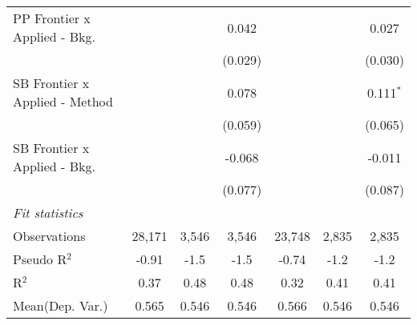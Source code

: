 \begin{tabular}{lcccccc}
   PP Frontier x Applied - Bkg.   &                &              & 0.042          &                &              & 0.027\\   
                                  &                &              & (0.029)        &                &              & (0.030)\\   
   SB Frontier x Applied - Method &                &              & 0.078          &                &              & 0.111$^{*}$\\   
                                  &                &              & (0.059)        &                &              & (0.065)\\   
   SB Frontier x Applied - Bkg.   &                &              & -0.068         &                &              & -0.011\\   
                                  &                &              & (0.077)        &                &              & (0.087)\\   
   \midrule
   \emph{Fit statistics}\\
   Observations                   & 28,171         & 3,546        & 3,546          & 23,748         & 2,835        & 2,835\\  
   Pseudo R$^2$                   & -0.91          & -1.5         & -1.5           & -0.74          & -1.2         & -1.2\\  
   R$^2$                          & 0.37           & 0.48         & 0.48           & 0.32           & 0.41         & 0.41\\  
Mean(Dep. Var.) & 0.565 & 0.546 & 0.546 & 0.566 & 0.546 & 0.546 \\
   

\end{tabular}
